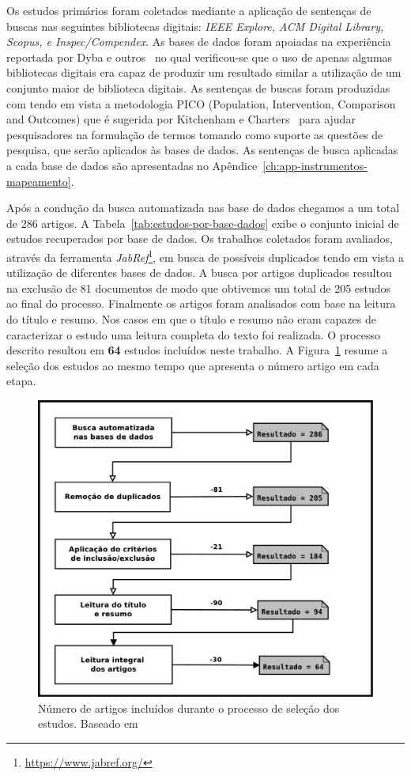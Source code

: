 Os estudos primários foram coletados mediante a aplicação de sentenças de buscas
nas seguintes bibliotecas digitais: \textit{IEEE Explore, ACM Digital Library,
	Scopus, e Inspec/Compendex}. As bases de dados foram  apoiadas na
experiência reportada por Dyba e outros~\cite{dybaa2007applying}  no qual
verificou-se que o uso de apenas algumas  bibliotecas digitais era capaz de
produzir um resultado similar a utilização de um conjunto maior de biblioteca
digitais. As sentenças de buscas foram produzidas com tendo em vista a
metodologia PICO (Population, Intervention, Comparison and Outcomes) que é
sugerida por Kitchenham e Charters~\cite{keele2007guidelines} para ajudar
pesquisadores na formulação de termos tomando como suporte as questões de
pesquisa, que serão aplicados às bases de dados. As sentenças de busca aplicadas
a cada base de dados são apresentadas no
Apêndice~\ref{ch:app-instrumentos-mapeamento}.

Após a condução da busca automatizada nas base de dados chegamos a um total de
286 artigos. A Tabela~\ref{tab:estudos-por-base-dados} exibe o conjunto inicial
de estudos recuperados por base de dados.  Os trabalhos coletados foram
avaliados, através da ferramenta
\textit{JabRef}\footnote{\url{https://www.jabref.org/}}, em busca de possíveis
duplicados tendo em vista a utilização de diferentes bases de dados. A busca por
artigos duplicados resultou na exclusão de 81 documentos de modo que obtivemos
um total de 205 estudos ao final do processo. Finalmente os artigos foram
analisados com base na leitura do título e resumo. Nos casos em que o título e
resumo não eram capazes de caracterizar o estudo uma leitura completa do texto
foi realizada. O processo descrito resultou em \textbf{64} estudos incluídos
neste trabalho. A Figura~\ref{fig:diagrama-processo-selecao} resume a seleção
dos estudos ao mesmo tempo que apresenta o número artigo em cada etapa.

\begin{figure} \centering \includegraphics[width=0.75\linewidth]
	{./chapter-mapeamento-sistematico/img/diagrama-processo-selecao.pdf}
	\caption{Número de artigos incluídos durante o processo de seleção dos
		estudos. Baseado
		em~\cite{Petersen2015}}\label{fig:diagrama-processo-selecao}
\end{figure}

